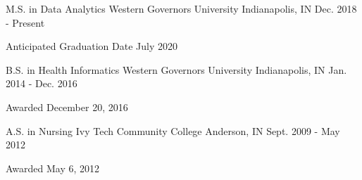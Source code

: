 
\begin{cventries}

  \cventry
    {M.S. in Data Analytics} %
    {Western Governors University} %
    {Indianapolis, IN} %
    {Dec. 2018 - Present} %
    {
      \begin{cvitems} %
        \item {Anticipated Graduation Date July 2020}
      \end{cvitems}
    }

  \cventry
    {B.S. in Health Informatics} %
    {Western Governors University} %
    {Indianapolis, IN} %
    {Jan. 2014 - Dec. 2016} %
    {
      \begin{cvitems} %
        \item {Awarded December 20, 2016}
      \end{cvitems}
    }


  \cventry
    {A.S. in Nursing} %
    {Ivy Tech Community College} %
    {Anderson, IN} %
    {Sept. 2009 - May 2012} %
    {
      \begin{cvitems} %
        \item {Awarded May 6, 2012}
      \end{cvitems}
    }

\end{cventries}
\newpage

